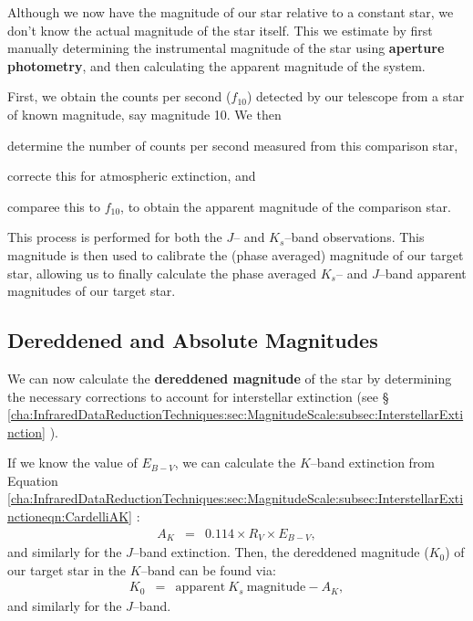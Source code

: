 Although we now have the magnitude of our star relative to a constant
star, we don't know the actual magnitude of the star itself. This we
estimate by first manually determining the instrumental magnitude of the
star using \textbf{aperture photometry}, and then calculating the apparent magnitude of the system. %

\vspace{\myparskip}

First, we obtain the counts per second ($f_{10}$) detected by our
telescope from a star of known magnitude, say magnitude 10. We then 
\begin{inparaenum}[(i)] 
\item determine the number of counts per second measured from this comparison star,
\item correcte this for atmospheric extinction, and
\item comparee this to $f_{10}$, to obtain the apparent magnitude of the comparison star. 
\end{inparaenum}

\vspace{\myparskip}

This process is performed for both the $J$-- and $K_{s}$--band observations. This magnitude is then used to calibrate the (phase averaged) magnitude of our target star, allowing us to finally calculate the phase averaged $K_{s}$-- and $J$--band apparent magnitudes of our target star. %


\subsection{Dereddened and Absolute Magnitudes}
\label{cha:InfraredDataReductionTechniques:sec:Photometry:subsec:DereddenedMagnitude}

We can now calculate the \textbf{dereddened magnitude} of the star by
determining the necessary corrections to account for interstellar
extinction (see \S~%
\vref{cha:InfraredDataReductionTechniques:sec:MagnitudeScale:subsec:InterstellarExtinction}%
). %

\vspace{\myparskip}

If we know the value of $E_{B-V}$, we can calculate the $K$--band extinction from Equation~%
\vref{cha:InfraredDataReductionTechniques:sec:MagnitudeScale:subsec:InterstellarExtinctioneqn:CardelliAK}%
: %
\begin{eqnarray} 
\label{cha:InfraredDataReductionTechniques:sec:Photometry:subsec:DereddenedMagnitude:eqn:CardelliAK}
A_{K}    & = & 0.114 \times R_V \times E_{B-V}, \nonumber
\end{eqnarray} 
and similarly for the $J$--band extinction. Then, the dereddened
magnitude ($K_{0}$) of our target star in the $K$--band can be found via:
\begin{eqnarray} 
\label{cha:InfraredDataReductionTechniques:sec:Photometry:subsec:DereddenedMagnitude:eqn:K0}
K_0 & = & \mathrm{apparent\ } K_{s} \mathrm{\ magnitude} - A_K,
\end{eqnarray} 
and similarly for the $J$--band. %


